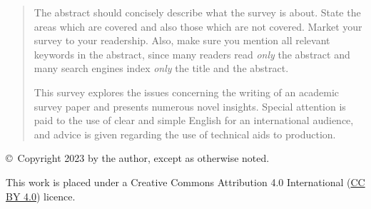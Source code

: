 \documentclass[11pt,onecolumn,twoside]{report}
\newcommand{\thisyear}{2023}         %
\renewcommand{\lstlistlistingname}{List of Listings}
\begin{document}
\begin{titlepage}
\begin{quote}
The abstract should concisely describe what the survey is about.
State the areas which are covered and also those which are not
covered. Market your survey to your readership. Also, make sure you
mention all relevant keywords in the abstract, since many readers read
\emph{only} the abstract and many search engines index \emph{only} the
title and the abstract.

This survey explores the issues concerning the writing of an academic
survey paper and presents numerous novel insights. Special attention
is paid to the use of clear and simple English for an international
audience, and advice is given regarding the use of technical aids to
production.
\end{quote}

\vfill

\begin{center}
{\footnotesize\sffamily \copyright~Copyright \thisyear{} by the author,
except as otherwise noted.}

\vspace{2mm}
{\footnotesize\sffamily This work is placed under a
Creative Commons Attribution 4.0 International
(\href{https://creativecommons.org/licenses/by/4.0/}{CC BY 4.0}) licence.}
\end{center}

\end{titlepage}




\cleardoublepage
\pagestyle{plain}             %


\begin{spacing}{0.8}
\tableofcontents
\end{spacing}

\cleardoublepage
\begin{spacing}{0.8}
\listoffigures
\end{spacing}

\cleardoublepage
\begin{spacing}{0.8}
\listoftables
\end{spacing}

\end{document}
